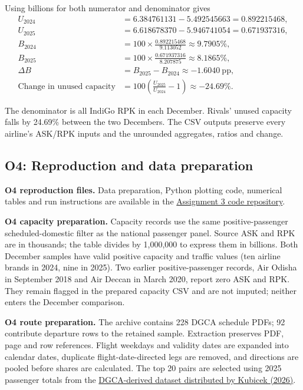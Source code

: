 Using billions for both numerator and denominator gives
\begin{align*}
U_{2024} &= 6.384761131-5.492545663=0.892215468, \\
U_{2025} &= 6.618678370-5.946741054=0.671937316, \\
B_{2024} &=100\times\frac{0.892215468}{9.113052}\approx 9.7905\%, \\
B_{2025} &=100\times\frac{0.671937316}{8.207875}\approx 8.1865\%, \\
\Delta B &= B_{2025}-B_{2024}\approx -1.6040\ \mathrm{pp}, \\
\text{Change in unused capacity} &=100\left(\frac{U_{2025}}{U_{2024}}-1\right)\approx -24.69\%.
\end{align*}

The denominator is all IndiGo RPK in each December. Rivals' unused capacity falls by 24.69\% between the two Decembers. The CSV outputs preserve every airline's ASK/RPK inputs and the unrounded aggregates, ratios and change.

\clearpage
\subsection{O4: Reproduction and data preparation}

\textbf{O4 reproduction files.} Data preparation, Python plotting code, numerical tables and run instructions are available in the \href{https://github.com/Goutham7358/Assignment3_Code}{Assignment 3 code repository}.

\textbf{O4 capacity preparation.} Capacity records use the same positive-passenger scheduled-domestic filter as the national passenger panel. Source ASK and RPK are in thousands; the table divides by 1,000,000 to express them in billions. Both December samples have valid positive capacity and traffic values (ten airline brands in 2024, nine in 2025). Two earlier positive-passenger records, Air Odisha in September 2018 and Air Deccan in March 2020, report zero ASK and RPK. They remain flagged in the prepared capacity CSV and are not imputed; neither enters the December comparison.

\textbf{O4 route preparation.} The archive contains 228 DGCA schedule PDFs; 92 contribute departure rows to the retained sample. Extraction preserves PDF, page and row references. Flight weekdays and validity dates are expanded into calendar dates, duplicate flight-date-directed legs are removed, and directions are pooled before shares are calculated. The top 20 pairs are selected using 2025 passenger totals from the \href{https://github.com/mkubicek/india-aviation-stats/tree/16770ac59dae61ce7b80fd8bd67dd7f4cef280a6}{DGCA-derived dataset distributed by Kubicek (2026)}.

